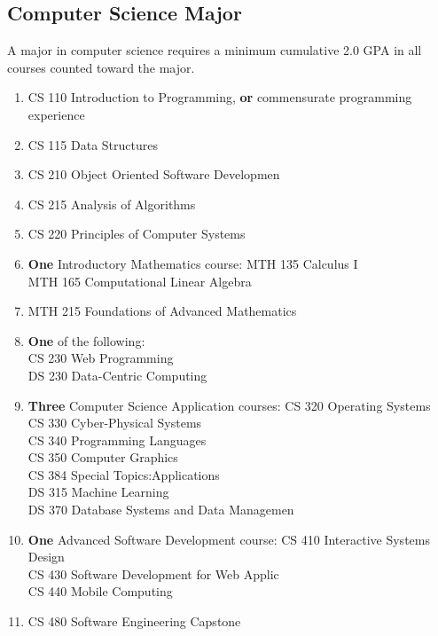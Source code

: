 \documentclass[
  letterpaper,
]{scrbook}
\providecommand{\tightlist}{%
  \setlength{\itemsep}{0pt}\setlength{\parskip}{0pt}}
\begin{document}
\subsection{Computer Science Major}\label{computer-science-major}

A major in computer science requires a minimum cumulative 2.0 GPA in all
courses counted toward the major.

\begin{enumerate}
\def\labelenumi{\arabic{enumi}.}
\tightlist
\item
  CS 110 Introduction to Programming, \textbf{or} commensurate
  programming experience\\
\item
  CS 115 Data Structures\\
\item
  CS 210 Object Oriented Software Developmen\\
\item
  CS 215 Analysis of Algorithms\\
\item
  CS 220 Principles of Computer Systems\\
\item
  \textbf{One} Introductory Mathematics course: MTH 135 Calculus I\\
  MTH 165 Computational Linear Algebra\\
\item
  MTH 215 Foundations of Advanced Mathematics\\
\item
  \textbf{One} of the following:\\
  CS 230 Web Programming\\
  DS 230 Data-Centric Computing\\
\item
  \textbf{Three} Computer Science Application courses: CS 320 Operating
  Systems\\
  CS 330 Cyber-Physical Systems\\
  CS 340 Programming Languages\\
  CS 350 Computer Graphics\\
  CS 384 Special Topics:Applications\\
  DS 315 Machine Learning\\
  DS 370 Database Systems and Data Managemen\\
\item
  \textbf{One} Advanced Software Development course: CS 410 Interactive
  Systems Design\\
  CS 430 Software Development for Web Applic\\
  CS 440 Mobile Computing\\
\item
  CS 480 Software Engineering Capstone
\end{enumerate}
\end{document}
